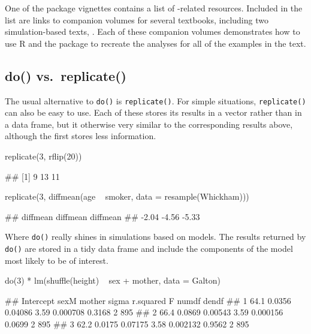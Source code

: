 One of the package vignettes \citep{mosaic-resources:2016} contains a
list of -related resources. Included in the list are links
to companion volumes for several textbooks, including two
simulation-based texts, \citep{Lock5,Tintle:2016}. Each of these
companion volumes demonstrates how to use R and the  package
to recreate the analyses for all of the examples in the text.

\subsection{do() vs.~replicate()}\label{do-vs.replicate}

The usual alternative to \texttt{do()} is \texttt{replicate()}. For
simple situations, \texttt{replicate()} can also be easy to use. Each of
these stores its results in a vector rather than in a data frame, but it
otherwise very similar to the corresponding results above, although the
first stores less information.

\begin{Schunk}
\begin{Sinput}
replicate(3, rflip(20)) 
\end{Sinput}
\begin{Soutput}
## [1]  9 13 11
\end{Soutput}
\begin{Sinput}
replicate(3, diffmean(age ~ smoker, data = resample(Whickham)))
\end{Sinput}
\begin{Soutput}
## diffmean diffmean diffmean 
##    -2.04    -4.56    -5.33
\end{Soutput}
\end{Schunk}

Where \texttt{do()} really shines in simulations based on models. The
results returned by \texttt{do()} are stored in a tidy data frame and
include the components of the model most likely to be of interest.

\begin{Schunk}
\begin{Sinput}
do(3) * lm(shuffle(height) ~ sex + mother, data = Galton)
\end{Sinput}
\begin{Soutput}
##   Intercept   sexM  mother sigma r.squared      F numdf dendf
## 1      64.1 0.0356 0.04086  3.59  0.000708 0.3168     2   895
## 2      66.4 0.0869 0.00543  3.59  0.000156 0.0699     2   895
## 3      62.2 0.0175 0.07175  3.58  0.002132 0.9562     2   895
\end{Soutput}
\end{Schunk}

